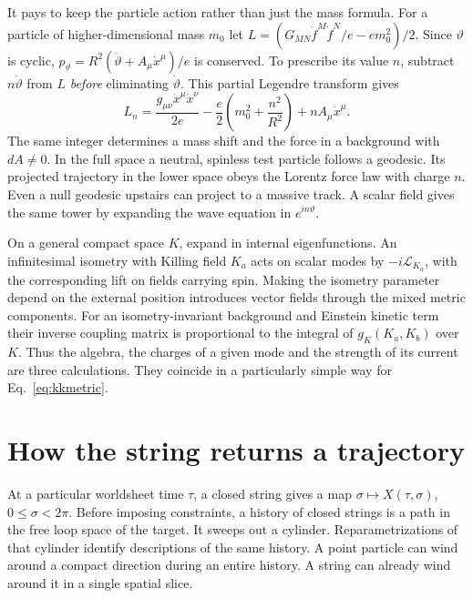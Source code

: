 \documentclass[10pt]{article}
\begin{document}
It pays to keep the particle action rather than just the mass formula. For a particle of higher-dimensional mass $m_0$ let $L=(G_{MN}\dot f^M\dot f^N/e-em_0^2)/2$. Since $\vartheta$ is cyclic, $p_\vartheta=R^2(\dot\vartheta+A_\mu\dot x^\mu)/e$ is conserved. To prescribe its value $n$, subtract $n\dot\vartheta$ from $L$ \emph{before} eliminating $\dot\vartheta$. This partial Legendre transform gives
\begin{equation}
 L_n=\frac{g_{\mu\nu}\dot x^\mu\dot x^\nu}{2e}
      -\frac e2\left(m_0^2+\frac{n^2}{R^2}\right)
      +n A_\mu\dot x^\mu .
 \label{eq:routh}
\end{equation}
The same integer determines a mass shift and the force in a background with $dA\ne0$. In the full space a neutral, spinless test particle follows a geodesic. Its projected trajectory in the lower space obeys the Lorentz force law with charge $n$. Even a null geodesic upstairs can project to a massive track. A scalar field gives the same tower by expanding the wave equation in $e^{in\vartheta}$.

On a general compact space $K$, expand in internal eigenfunctions. An infinitesimal isometry with Killing field $K_a$ acts on scalar modes by $-i\mathcal L_{K_a}$, with the corresponding lift on fields carrying spin. Making the isometry parameter depend on the external position introduces vector fields through the mixed metric components. For an isometry-invariant background and Einstein kinetic term their inverse coupling matrix is proportional to the integral of $g_K(K_a,K_b)$ over $K$. Thus the algebra, the charges of a given mode and the strength of its current are three calculations. They coincide in a particularly simple way for Eq.~\eqref{eq:kkmetric}.

\section{How the string returns a trajectory}

At a particular worldsheet time $\tau$, a closed string gives a map $\sigma\mapsto X(\tau,\sigma)$, $0\leq\sigma<2\pi$. Before imposing constraints, a history of closed strings is a path in the free loop space of the target. It sweeps out a cylinder. Reparametrizations of that cylinder identify descriptions of the same history. A point particle can wind around a compact direction during an entire history. A string can already wind around it in a single spatial slice.
\end{document}
